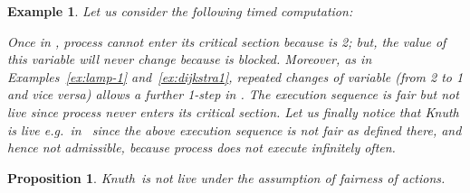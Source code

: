 \documentclass[copyright,creativecommons]{eptcs}
\newtheorem{proposition}[theorem]{Proposition}
\newtheorem{example}[theorem]{Example}
\newcommand{\knutha}{{\sf Knuth}} \newcommand{\knuthb}{\knutha}
\begin{document}
\begin{example}\rm\label{ex:knuth}
Let us consider the following timed computation:



\vspace{0.15cm}

\noindent Once in , process  cannot enter its critical section
because  is 2; but, the value of this variable will
never change because  is blocked. Moreover, as in
Examples~\ref{ex:lamp-1} and~\ref{ex:dijkstra1}, repeated changes of
variable  (from 2 to 1 and vice versa) allows a further 1-step in
.
The execution sequence  is fair but not live since
process  never enters its critical section. Let us finally notice
that Knuth is live e.g.\ in~\cite{Bogunovic03} since the above execution
sequence is not fair as defined there, and hence not admissible, because
process  does not execute infinitely often. 
\end{example}
\begin{proposition}\label{prop:knuth}
\knutha\ is not live under the assumption of fairness of actions.
\end{proposition}
\end{document}
